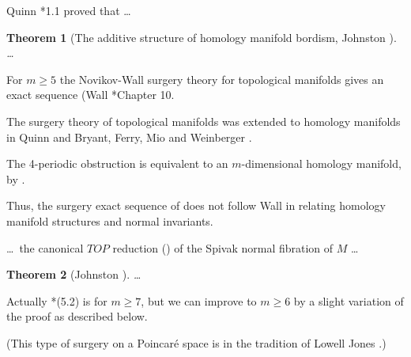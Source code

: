 \documentclass{article}
\newenvironment{dual}{%
  \par\medskip
  \trivlist\item[]%
}{%
  \endtrivlist
}
\newcommand{\backup}{%
  \vspace*{-\baselineskip}\vspace*{-\medskipamount}\nopagebreak
}
\newtheorem{thm}{Theorem}[section]
\begin{document}
\begin{dual}
Quinn \cite{Q2}*{1.1} proved that \dots
\end{dual}

\begin{dual}\backup
\begin{thm}[The additive structure of
  homology manifold bordism, Johnston
  \cite{Jo}]
\dots
\end{thm}
\end{dual}

\begin{dual}
For $m\geq 5$ the Novikov-Wall surgery theory
for topological manifolds gives an exact
sequence (Wall \cite{Wa}*{Chapter 10}.
\end{dual}

\begin{dual}
The surgery theory of topological manifolds
was extended to homology manifolds in Quinn
\cites{Q1,Q2} and Bryant, Ferry, Mio
and Weinberger \cite{BFMW}.
\end{dual}

\begin{dual}
The 4-periodic obstruction is equivalent to
an $m$-dimensional homology manifold, by
\cite{BFMW}.
\end{dual}

\begin{dual}
Thus, the surgery exact sequence of
\cite{BFMW} does not follow Wall \cite{Wa} in
relating homology manifold structures and
normal invariants.
\end{dual}

\begin{dual}
\dots\ the canonical $TOP$ reduction
(\cite{FP}) of the Spivak normal fibration of
$M$ \dots
\end{dual}

\begin{dual}\backup
\begin{thm}[Johnston \cite{Jo}]
\dots
\end{thm}
\end{dual}

\begin{dual}
Actually \cite{Jo}*{(5.2)} is for $m\geq 7$,
but we can improve to $m\geq 6$ by a slight
variation of the proof as described below.
\end{dual}

\begin{dual}
(This type of surgery on a Poincar\'e space
is in the tradition of Lowell Jones
\cite{Jn}.)
\end{dual}



\end{document}
